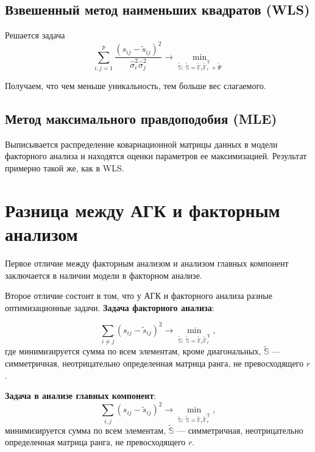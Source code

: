 \documentclass[specialist, 12pt,
subf, %
href, colorlinks=true,
substylefile = spbu.rtx,
]{disser}
\begin{document}
\subsection{Взвешенный метод наименьших квадратов (WLS)}

Решается задача
\begin{equation*}
\sum\limits_{i,j=1}^p \frac{(s_{ij}-\widetilde{s}_{ij})^2}{\widehat{\sigma}_i^2 \widehat{\sigma}_j^2}\to \min\limits_{\widetilde{\mathbb{S}}:~ \widetilde{\mathbb{S}}=\widetilde{\mathbb{F}}_r\widetilde{\mathbb{F}}_r^\mathrm{T}+\widetilde{\Psi}}
\end{equation*}

Получаем, что чем меньше уникальность, тем больше вес слагаемого.

\subsection{Метод максимального правдоподобия (MLE)}
Выписывается распределение ковариационной матрицы данных в модели факторного анализа
и находятся оценки параметров ее максимизацией. Результат примерно такой же, как в WLS.


\section{Разница между АГК и факторным анализом}

Первое отличие между факторным анализом и анализом главных компонент заключается в наличии модели в факторном анализе.

Второе отличие состоит в том, что у АГК и факторного анализа разные оптимизационные задачи. \textbf{Задача факторного анализа}:

\begin{equation*}
\sum\limits_{i\ne j} (s_{ij}-\widetilde{s}_{ij})^2\to \min\limits_{\widetilde{\mathbb{S}}:~ \widetilde{\mathbb{S}}=\widetilde{\mathbb{F}}_r\widetilde{\mathbb{F}}_r^\mathrm{T}},
\end{equation*}
 где минимизируется сумма по всем элементам, кроме диагональных, $\widetilde{\mathbb{S}}$ --- симметричная, неотрицательно определенная матрица ранга, не превосходящего $r$.

\textbf{Задача в анализе главных компонент}:
\begin{equation*}
\sum\limits_{i,j} (s_{ij}-\widetilde{s}_{ij})^2 \to \min\limits_{\widetilde{\mathbb{S}}:~ \widetilde{\mathbb{S}}=\widetilde{\mathbb{F}}_r\widetilde{\mathbb{F}}_r^\mathrm{T}},
\end{equation*}
минимизируется сумма по всем элементам, $\widetilde{\mathbb{S}}$ --- симметричная, неотрицательно определенная матрица ранга, не превосходящего $r$.
\end{document}
